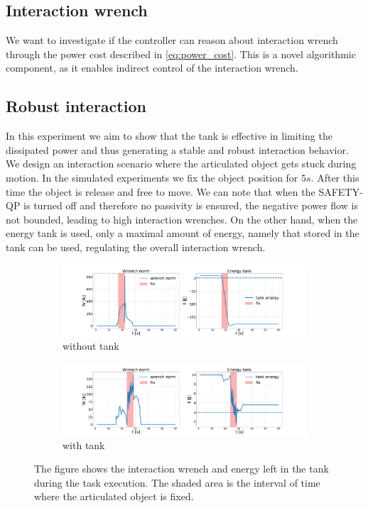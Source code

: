 \subsection{Interaction wrench}
We want to investigate if the controller can reason about interaction wrench through the power cost described in \eqn \ref{eq:power_cost}. This is a novel algorithmic component, as it enables indirect control of the interaction wrench. 

\subsection{Robust interaction}
In this experiment we aim to show that the tank is effective in limiting the dissipated power and thus generating a stable and robust interaction behavior. We design an interaction scenario where the articulated object gets stuck during motion. In the simulated experiments we fix the object position for $5s$. After this time the object is release and free to move. We can note that when the SAFETY-QP is turned off and therefore no passivity is ensured, the negative power flow is not bounded, leading to high interaction wrenches. On the other hand, when the energy tank is used, only a maximal amount of energy, namely that stored in the tank can be used, regulating the overall interaction wrench.    

\begin{figure}[t]
\centering
\hspace*{-1.35cm} 
\begin{subfigure}{1.3\columnwidth}
    \includegraphics[width=\linewidth]{figures/fix_experiment/wrench_tank_without_tank.pdf}
    \caption{without tank}
\end{subfigure}
\hspace*{-1.35cm} 
\begin{subfigure}{1.3\columnwidth}
    \includegraphics[width=\linewidth]{figures/fix_experiment/wrench_tank_with_tank.pdf}
    \caption{with tank}
\end{subfigure}
\hfill
\caption{The figure shows the interaction wrench and energy left in the tank during the task execution. The shaded area is the interval of time where the articulated object is fixed.  }\label{fig:methods_comparison}
\end{figure}
